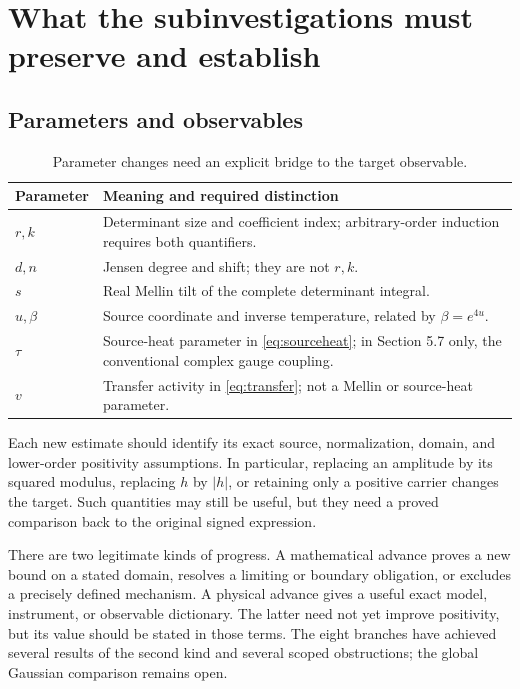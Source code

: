 \documentclass[11pt,letterpaper]{article}
\numberwithin{equation}{section}
\theoremstyle{remark}
\begin{document}
\section{What the subinvestigations must preserve and establish}
\label{sec:obligations}

\subsection{Parameters and observables}

\begin{table}[htbp]
\centering
\renewcommand{\arraystretch}{1.15}
\begin{tabularx}{\textwidth}{@{}p{}X@{}}
\toprule
Parameter & Meaning and required distinction\\
\midrule
$r,k$ & Determinant size and coefficient index; arbitrary-order induction requires both quantifiers.\\
$d,n$ & Jensen degree and shift; they are not $r,k$.\\
$s$ & Real Mellin tilt of the complete determinant integral.\\
$u,\beta$ & Source coordinate and inverse temperature, related by $\beta=e^{4u}$.\\
$\tau$ & Source-heat parameter in \eqref{eq:sourceheat}; in Section 5.7 only, the conventional complex gauge coupling.\\
$v$ & Transfer activity in \eqref{eq:transfer}; not a Mellin or source-heat parameter.\\
\bottomrule
\end{tabularx}
\caption{Parameter changes need an explicit bridge to the target observable.}
\end{table}

Each new estimate should identify its exact source, normalization,
domain, and lower-order positivity assumptions. In particular, replacing
an amplitude by its squared modulus, replacing $h$ by $|h|$, or
retaining only a positive carrier changes the target. Such quantities
may still be useful, but they need a proved comparison back to the
original signed expression.

There are two legitimate kinds of progress. A mathematical advance
proves a new bound on a stated domain, resolves a limiting or boundary
obligation, or excludes a precisely defined mechanism. A physical
advance gives a useful exact model, instrument, or observable dictionary.
The latter need not yet improve positivity, but its value should be
stated in those terms. The eight branches have achieved several
results of the second kind and several scoped obstructions; the
global Gaussian comparison remains open.
\end{document}
